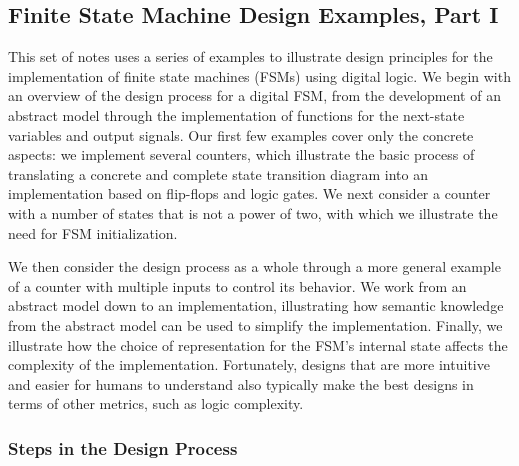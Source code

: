 \classtitle

\subsection{Finite State Machine Design Examples, Part I}

This set of notes uses a series of examples to illustrate design principles 
for the implementation of finite state machines (FSMs) using digital logic.
We begin with an overview of the design process for a digital FSM, from
the development of an abstract model through the implementation of
functions for the next-state variables and output signals.
Our first few examples cover only the concrete aspects:
we implement several counters, which illustrate the basic 
process of translating a concrete and complete state transition diagram
into an implementation based on flip-flops and logic gates.
We next consider a counter with a number of states that is not a power of
two, with which we illustrate the need for FSM initialization.

We then consider the design process as a whole through a more general
example of a counter with multiple inputs to control its behavior. 
We work from
an abstract model down to an implementation, illustrating how semantic
knowledge from the abstract model can be used to simplify the 
implementation.  Finally, we illustrate how the choice of representation
for the FSM's internal state affects the complexity of the implementation.
Fortunately, designs that are more intuitive and easier for humans to
understand also typically make the best designs in terms of 
other metrics, such as logic complexity.\\


\subsubsection{Steps in the Design Process}


